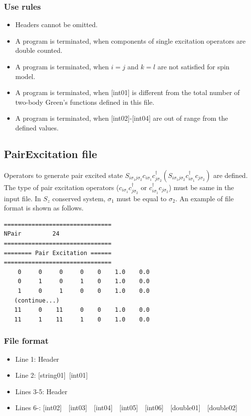\subsubsection{Use rules}
\begin{itemize}
\item Headers cannot be omitted. 
\item A program is terminated, when components of single excitation operators are double counted.
\item {A program is terminated, when $i=j$ and $k=l$ are not satisfied for spin model.}
\item A program is terminated, when $[$int01$]$ is different from the total number of two-body Green's functions defined in this file.
\item A program is terminated, when $[$int02$]$-$[$int04$]$ are out of range from the defined values.
\end{itemize}

\newpage
\subsection{{PairExcitation file}}
\label{Subsec:pairexcitation}
Operators to generate pair excited state $S_{i\sigma_1j\sigma_2}c_{i\sigma_1}c_{j\sigma_2}^{\dagger}(S_{i\sigma_1j\sigma_2}c_{i\sigma_1}^{\dagger}c_{j\sigma_2})$ are defined. The type of pair excitation operators ($c_{i\sigma_1}c_{j\sigma_2}^{\dagger}$ or $c_{i\sigma_1}^{\dagger}c_{j\sigma_2}$) must be same in the input file. In $S_z$ conserved system, $\sigma_1$ must be equal to $\sigma_2$. An example of file format is shown as follows.

\begin{minipage}{12.5cm}
\begin{screen}
\begin{verbatim}
===============================
NPair         24
===============================
======== Pair Excitation ======
===============================
    0     0     0     0    0    1.0    0.0
    0     1     0     1    0    1.0    0.0
    1     0     1     0    0    1.0    0.0
   (continue...)
   11     0    11     0    0    1.0    0.0
   11     1    11     1    0    1.0    0.0
\end{verbatim}
\end{screen}
\end{minipage}

\subsubsection{File format}
 \begin{itemize}
   \item  Line 1:  Header
   \item  Line 2:   [string01]~[int01]
   \item  Lines 3-5:  Header
   \item  Lines 6-: 
  [int02]~~[int03]~~[int04]~~[int05]~~[int06]~~[double01]~~[double02]
  \end{itemize}
